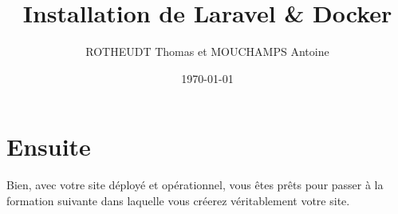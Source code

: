 \documentclass[internal]{nhitec_design}
\author{ROTHEUDT Thomas et MOUCHAMPS Antoine}
\date{\today}
\title{Installation de Laravel \& Docker}
\begin{document}
\maketitle
\newpage
{
\hypersetup{linkcolor=black}
\color{red_nhitec}
\tableofcontents
}

\newpage









\section[Ensuite]{Ensuite\label{sec:suite}}

Bien, avec votre site déployé et opérationnel, vous êtes prêts pour passer à la formation suivante dans laquelle vous créerez véritablement votre site.
\end{document}
